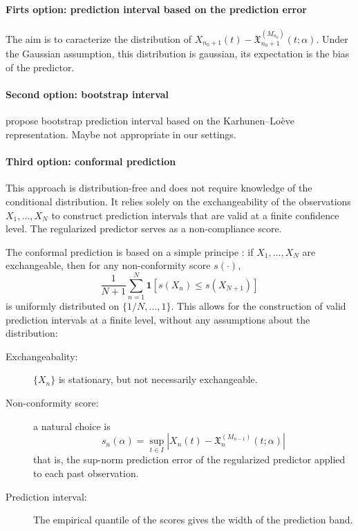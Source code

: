 \documentclass{article}
\begin{document}
\paragraph{Firts option: prediction interval based on the prediction error}
The aim is to caracterize the distribution of
$X_{n_0+1}(t) - \mathfrak{X}^{(M_{n_0})}_{n_0+1}(t;\alpha).$
Under the Gaussian assumption, this distribution is gaussian, its expectation is the bias of the predictor.

\paragraph{Second option: bootstrap interval}
\cite{paparoditis2023boot} propose bootstrap prediction interval based on the Karhunen–Loève representation. Maybe not appropriate in our settings.


\paragraph{Third option: conformal prediction}
This approach is distribution-free and does not require knowledge of the conditional distribution. It relies solely on the exchangeability of the observations $X_1,\ldots,X_N$ to construct prediction intervals that are valid at a finite confidence level. The regularized predictor serves as a non-compliance score. 

The conformal prediction is based on a simple principe : if $X_1,\ldots,X_N$ are exchangeable, then for any non-conformity score $s(\cdot)$,
 $$\frac{1}{N+1}\sum_{n=1}^{N} \mathbf{1}[s(X_n) \leq s(X_{N+1})]$$
is uniformly distributed on $\{1/N,\ldots,1\}$. This allows for the construction of valid prediction intervals at a finite level, without any assumptions about the distribution:
\begin{description}
\item[Exchangeabality:] $\{X_n\}$ is stationary, but not necessarily exchangeable.
\item[Non-conformity score:] a natural choice is
$$
s_n(\alpha) = \sup_{t\in I} \left|X_n(t) - \mathfrak{X}^{(M_{n-1})}_{n}(t;\alpha)\right|
$$
that is, the sup-norm prediction error of the regularized predictor applied to each past observation.
\item[Prediction interval:] The empirical quantile of the scores gives the width of the prediction band. 
\end{description}
\end{document}
